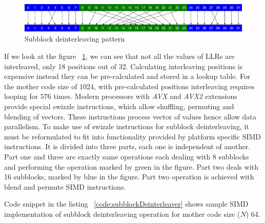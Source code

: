 \begin{figure}[]
	\centering
	\includegraphics[width=1.0\textwidth]{./figures/subblockDeinterleaver.pdf}
	\caption{Subblock deinterleaving pattern}
	\label{fig:subblockDeinterleaver}
\end{figure}


If we look at the figure ~\ref{fig:subblockDeinterleaver}, we can see that not all the values of LLRs are interleaved, only 18 positions out of 32. Calculating interleaving positions is expensive instead they can be pre-calculated and stored in a lookup table. For the mother code size of 1024, with pre-calculated positions interleaving requires looping for $ 576 $ times. Modern processors with \textit{AVX} and \textit{AVX2} extensions provide special swizzle instructions, which allow shuffling, permuting and blending of vectors. These instructions process vector of values hence allow data parallelism. To make use of swizzle instructions for subblock deinterleaving, it must be reformulated to fit into functionality provided by platform specific SIMD instructions. It is divided into three parts, each one is independent of another. Part one and three are exactly same operations each dealing with 8 subblocks and performing the operation marked by green in the figure. Part two deals with 16 subblocks, marked by blue in the figure. Part two operation is achieved with blend and permute SIMD instructions.

Code snippet in the listing ~\ref{code:subblockDeinterleaver} shows sample SIMD implementation of subblock deinterleaving operation for mother code size ($N$) 64.

